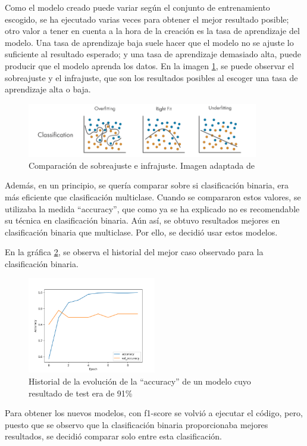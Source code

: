 Como el modelo creado puede variar según el conjunto de entrenamiento escogido, se ha ejecutado varias veces para obtener el mejor resultado posible; otro valor a tener en cuenta a la hora de la creación es la tasa de aprendizaje del modelo. Una tasa de aprendizaje baja suele hacer que el modelo no se ajuste lo suficiente al resultado esperado; y una tasa de aprendizaje demasiado alta, puede producir que el modelo aprenda los datos. En la imagen \ref{fig:overfiting}, se puede observar el sobreajuste y el infrajuste, que son los resultados posibles al escoger una tasa de aprendizaje alta o baja.
        \begin{figure}[!ht]
                 \centering
                 \includegraphics[width=0.9\textwidth]{img/overfiting-underfiting.png}
                  \caption{Comparación de sobreajuste e infrajuste. Imagen adaptada de \cite{mathworks-overfitting}}
                 \label{fig:overfiting}
        \end{figure}

Además, en un principio, se quería comparar sobre si clasificación binaria, era más eficiente que clasificación multiclase. Cuando se compararon estos valores, se utilizaba la medida ``accuracy'', que como ya se ha explicado no es recomendable su técnica en clasificación binaria. Aún así, se obtuvo resultados mejores en clasificación binaria que multiclase. Por ello, se decidió usar estos modelos.

En la gráfica \ref{fig:accuracy}, se observa el historial del mejor caso observado para la clasificación binaria.

        \begin{figure}[!ht]
                 \centering
                 \includegraphics[width=0.5\textwidth]{img/modelo2-0.009int2_0.913043498992919920230525-172156.png}
                  \caption{Historial de la evolución de la ``accuracy''  de un modelo cuyo resultado de test era de 91\% }
                 \label{fig:accuracy}
        \end{figure}
Para obtener los nuevos modelos, con f1-score se volvió a ejecutar el código, pero, puesto que se observo que la clasificación binaria proporcionaba mejores resultados, se decidió comparar solo entre esta clasificación.

